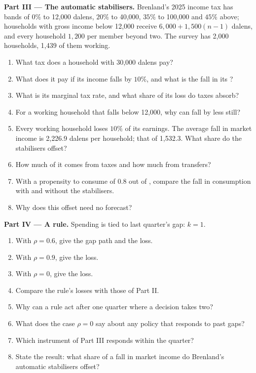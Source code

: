 \begin{problem}
\medskip\noindent\textbf{Part III --- The automatic stabilisers.} Brenland's 2025
income tax has bands of $0\%$ to 12,000 dalens, $20\%$ to 40,000, $35\%$ to 100,000 and $45\%$
above; households with gross income below 12,000 receive $6{,}000 + 1{,}500(n - 1)$ dalens,
and every household $1{,}200$ per member beyond two. The survey has 2,000
households, 1,439 of them working.
\begin{enumerate}[resume]
  \item What tax does a household with 30,000 dalens pay?
  \item What does it pay if its income falls by $10\%$, and what is the
    fall in its ?
  \item What is its marginal tax rate, and what share of its loss do taxes absorb?
  \item For a working household that falls below 12,000, why can  fall by less still?
  \item Every working household loses $10\%$ of its earnings. The average fall in
    market income is 2,226.9 dalens per household; that of 
    1,532.3. What share do the stabilisers offset?
  \item How much of it comes from taxes and how much from transfers?
  \item With a propensity to consume of $0.8$ out of , compare
    the fall in consumption with and without the stabilisers.
  \item Why does this offset need no forecast?
\end{enumerate}

\medskip\noindent\textbf{Part IV --- A rule.} Spending is tied to last quarter's gap: $k = 1$.
\begin{enumerate}[resume]
  \item With $\rho = 0.6$, give the gap path and the loss.
  \item With $\rho = 0.9$, give the loss.
  \item With $\rho = 0$, give the loss.
  \item Compare the rule's losses with those of Part II.
  \item Why can a rule act after one quarter where a decision takes two?
  \item What does the case $\rho = 0$ say about any policy that responds to past gaps?
  \item Which instrument of Part III responds within the quarter?
  \item State the result: what share of a fall in market income do Brenland's automatic stabilisers offset?
\end{enumerate}
\end{problem}

